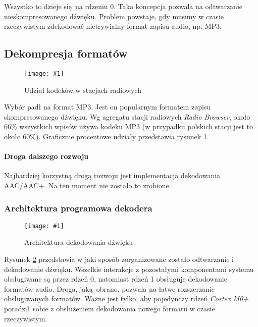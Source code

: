 \documentclass[12pt]{report}
\newcommand{\imgint}[4]{
	\begin{figure}[{#4}]
		\centering
		\texttt{[image: \#1]}
		\caption{#2}
		\label{#1}
	\end{figure}
}
\newcommand{\imgh}[3]{\imgint{#1}{#2}{#3}{H}}
\begin{document}

	Wszystko to dzieje się na rdzeniu 0. Taka koncepcja pozwala na odtwarzanie nieskompresowanego dźwięku. Problem powstaje, gdy musimy w czasie rzeczywistym zdekodować nietrywialny format zapisu audio, np. MP3.
	
	\subsection{Dekompresja formatów}
	\imgh{3/rb_chart}{Udział kodeków w stacjach radiowych}{0.7}
	
	Wybór padł na format MP3. Jest on popularnym formatem zapisu skompresowanego dźwięku. Wg agregatu stacji radiowych \textit{Radio Browser}\textsuperscript{\cite{radio_browser_codecs}}, około 66\% wszystkich wpisów używa kodeku MP3 (w przypadku polskich stacji jest to około 60\%). Graficznie procentowe udziały przedstawia rysunek \ref{3/rb_chart}.
	
	\paragraph{Droga dalszego rozwoju}
	Najbardziej korzystną drogą rozwoju jest implementacja dekodowania AAC/AAC+. Na ten moment nie zostało to zrobione.
	$ $\\
	
	\subsubsection{Architektura programowa dekodera}
	\imgh{3/PicoRadio-sound-decoding}{Architektura dekodowania dźwięku}{0.95}
	
	Rysunek \ref{3/PicoRadio-sound-decoding} przedstawia w jaki sposób zorganizowane zostało odtwarzanie i dekodowanie dźwięku. Wszelkie interakcje z pozostałymi komponentami systemu obsługiwane są przez rdzeń 0, natomiast rdzeń 1 obsługuje dekodowanie formatów audio. Droga, jaką obrano, pozwala na łatwe rozszerzanie obsługiwanych formatów. Ważne jest tylko, aby pojedynczy rdzeń \textit{Cortex M0+} poradził sobie z obsłużeniem dekodowania nowego formatu w czasie rzeczywistym.
	
\end{document}
